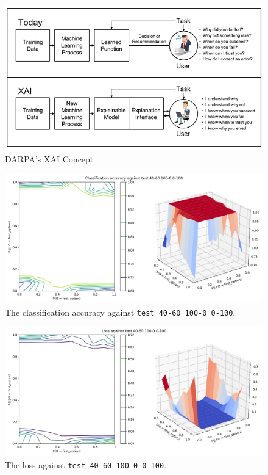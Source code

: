 \documentclass{report}
\newcommand{\code}{\texttt}
\begin{document}
\begin{figure}[h]
    \centering
    \includegraphics[scale=1.1]{figures/xai-figure2.png}
    \caption[]{DARPA's XAI Concept~\protect\cite[]{gunningXAIProgram}}
    \label{fig:darpa_xai}
\end{figure}

% 
% 

\begin{figure}[h]
    \centering
    \includegraphics[width=\textwidth]{test_40-60_100-0_0-100_accuracy.png}
    \caption[]{The classification accuracy against \code{test 40-60 100-0 0-100}.}
    \label{fig:test_40-60_100-0_0-100_accuracy_plot}
\end{figure}

\begin{figure}[h]
    \centering
    \includegraphics[width=\textwidth]{test_40-60_100-0_0-100_loss.png}
    \caption[]{The loss against \code{test 40-60 100-0 0-100}.}
    \label{fig:test_40-60_100-0_0-100_loss_plot}
\end{figure}
\end{document}
